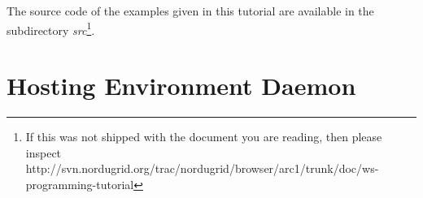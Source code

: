 

The source code of the examples given in this tutorial are available in the subdirectory \textit{src}\footnote{If this was not shipped with the document you are reading, then please inspect\\ http://svn.nordugrid.org/trac/nordugrid/browser/arc1/trunk/doc/ws-programming-tutorial}. 


\section{Hosting Environment Daemon}

